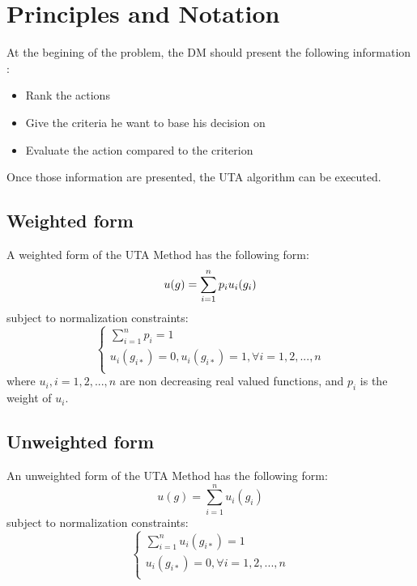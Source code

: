 \documentclass{report}
\begin{document}
\section{Principles and Notation}
At the begining of the problem, the DM should present the following information : 
\begin{itemize}
\item Rank the actions
\item Give the criteria he want to base his decision on 
\item Evaluate the action compared to the criterion
\end{itemize}
Once those information are presented, the UTA algorithm can be executed. 

\subsection{Weighted form}
A weighted form of the UTA Method has the following form: 
\begin{equation}
	u(g) = \sum_{i=1}^{n} p_i u_i (g_i)\\
\end{equation}
subject to normalization constraints:\\
\begin{equation}
      \begin{cases}
      	\sum_{i=1}^{n} p_i = 1 \\
      	u_i(g_{i*}) = 0, u_i(g_{i*}) = 1,  \forall i = 1, 2, ..., n\\
      \end{cases}
\end{equation}
where $ u_i, i = 1,2,...,n$ are non decreasing real valued functions, and $p_i$ is the weight of $u_i$.\\

\subsection{Unweighted form}
An unweighted form of the UTA Method has the following form: 
\begin{equation}\label{eq1}
      u(g) = \sum_{i=1}^{n} u_i (g_i)
\end{equation}
subject to normalization constraints:\\
\begin{equation}\label{eq2}
      \begin{cases}
      	\sum_{i=1}^{n} u_i(g_{i*}) = 1\\
       	u_i(g_{i*}) = 0,  \forall i = 1, 2, ..., n\\
      \end{cases}
\end{equation}
\end{document}
